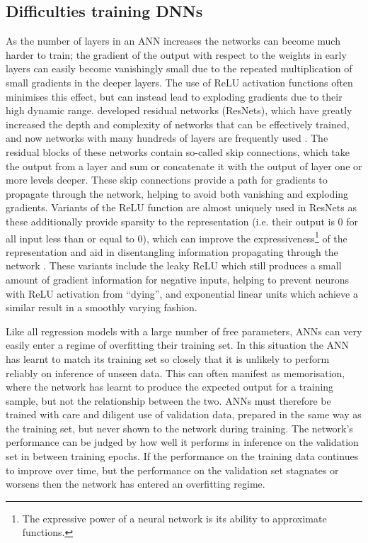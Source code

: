 \subsection{Difficulties training DNNs}

As the number of layers in an ANN increases the networks can become much harder to train; the gradient of the output with respect to the weights in early layers can easily become vanishingly small due to the repeated multiplication of small gradients in the deeper layers.
The use of ReLU activation functions often minimises this effect, but can instead lead to exploding gradients due to their high dynamic range.
\citet{2015He} developed residual networks (ResNets), which have greatly increased the depth and complexity of networks that can be effectively trained, and now networks with many hundreds of layers are frequently used \citep[e.g.][]{Jegou2017}.
The residual blocks of these networks contain so-called skip connections, which take the output from a layer and sum or concatenate it with the output of layer one or more levels deeper.
These skip connections provide a path for gradients to propagate through the network, helping to avoid both vanishing and exploding gradients.
Variants of the ReLU function are almost uniquely used in ResNets as these additionally provide sparsity to the representation (i.e. their output is 0 for all input less than or equal to 0), which can improve the expressiveness\footnote{The expressive power of a neural network is its ability to approximate functions.} of the representation and aid in disentangling information propagating through the network \citep{Glorot2011}.
These variants include the leaky ReLU \citep[$\max(0.01x, x)$;][]{Maas2013} which still produces a small amount of gradient information for negative inputs, helping to prevent neurons with ReLU activation from ``dying'', and exponential linear units \citep[ELUs;][]{Clevert2015} which achieve a similar result in a smoothly varying fashion.

Like all regression models with a large number of free parameters, ANNs can very easily enter a regime of overfitting their training set.
In this situation the ANN has learnt to match its training set so closely that it is unlikely to perform reliably on inference of unseen data.
This can often manifest as memorisation, where the network has learnt to produce the expected output for a training sample, but not the relationship between the two.
ANNs must therefore be trained with care and diligent use of validation data, prepared in the same way as the training set, but never shown to the network during training.
The network's performance can be judged by how well it performs in inference on the validation set in between training epochs.
If the performance on the training data continues to improve over time, but the performance on the validation set stagnates or worsens then the network has entered an overfitting regime.

